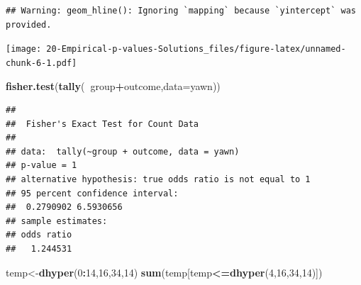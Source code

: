 \documentclass[
]{book}
\newenvironment{Shaded}{\begin{snugshade}}{\end{snugshade}}
\newcommand{\DataTypeTok}[1]{\textcolor[rgb]{0.13,0.29,0.53}{#1}}
\newcommand{\DecValTok}[1]{\textcolor[rgb]{0.00,0.00,0.81}{#1}}
\newcommand{\KeywordTok}[1]{\textcolor[rgb]{0.13,0.29,0.53}{\textbf{#1}}}
\newcommand{\NormalTok}[1]{#1}
\newcommand{\OperatorTok}[1]{\textcolor[rgb]{0.81,0.36,0.00}{\textbf{#1}}}
\newcommand{\StringTok}[1]{\textcolor[rgb]{0.31,0.60,0.02}{#1}}
\begin{document}
\begin{Shaded}
\end{Shaded}

\begin{verbatim}
## Warning: geom_hline(): Ignoring `mapping` because `yintercept` was provided.
\end{verbatim}

\texttt{[image: 20-Empirical-p-values-Solutions\_files/figure-latex/unnamed-chunk-6-1.pdf]}

\begin{Shaded}
\begin{Highlighting}[]
\KeywordTok{fisher.test}\NormalTok{(}\KeywordTok{tally}\NormalTok{(}\OperatorTok{~}\NormalTok{group}\OperatorTok{+}\NormalTok{outcome,}\DataTypeTok{data=}\NormalTok{yawn))}
\end{Highlighting}
\end{Shaded}

\begin{verbatim}
## 
##  Fisher's Exact Test for Count Data
## 
## data:  tally(~group + outcome, data = yawn)
## p-value = 1
## alternative hypothesis: true odds ratio is not equal to 1
## 95 percent confidence interval:
##  0.2790902 6.5930656
## sample estimates:
## odds ratio 
##   1.244531
\end{verbatim}

\begin{Shaded}
\begin{Highlighting}[]
\NormalTok{temp<-}\KeywordTok{dhyper}\NormalTok{(}\DecValTok{0}\OperatorTok{:}\DecValTok{14}\NormalTok{,}\DecValTok{16}\NormalTok{,}\DecValTok{34}\NormalTok{,}\DecValTok{14}\NormalTok{)}
\KeywordTok{sum}\NormalTok{(temp[temp}\OperatorTok{<=}\KeywordTok{dhyper}\NormalTok{(}\DecValTok{4}\NormalTok{,}\DecValTok{16}\NormalTok{,}\DecValTok{34}\NormalTok{,}\DecValTok{14}\NormalTok{)])}
\end{Highlighting}
\end{Shaded}
\end{document}

